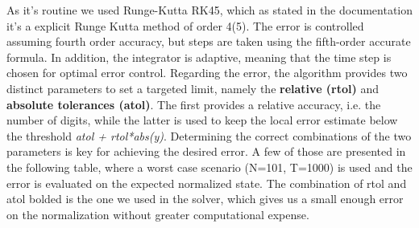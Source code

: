 \documentclass[11pt, twoside]{report}
\begin{document}
As it's routine we used Runge-Kutta RK45, which as stated in the documentation it's a explicit Runge Kutta method of order 4(5). The error is controlled assuming fourth order accuracy, but steps are taken using the fifth-order accurate formula. In addition, the integrator is adaptive, meaning that the time step is chosen for optimal error control. Regarding the error, the algorithm provides two distinct parameters to set a targeted limit, namely the \textbf{relative (rtol)} and \textbf{absolute tolerances (atol)}. The first provides a relative accuracy, i.e. the number of digits, while the latter is used to keep the local error estimate below the threshold \textit{atol + rtol*abs(y)}. Determining the correct combinations of the two parameters is key for achieving the desired error. A few of those are presented in the following table, where a worst case scenario (N=101, T=1000) is used and the error is evaluated on the expected normalized state. The combination of rtol and atol bolded is the one we used in the solver, which gives us a small enough error on the normalization without greater computational expense.\\

\newpage
{}

\end{document}

